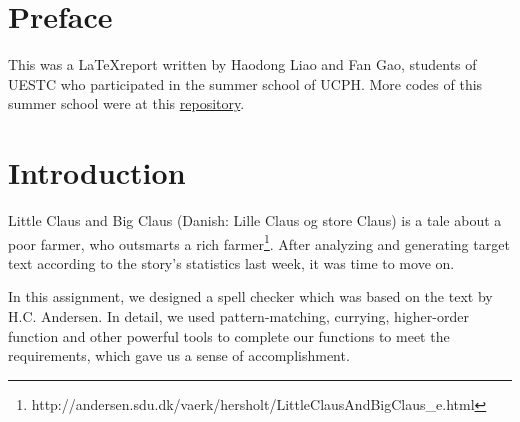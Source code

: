 \documentclass{article}
\begin{document}





\section{Preface}

This was a \LaTeX report written by Haodong Liao and Fan Gao, students of UESTC who participated in the summer school of UCPH. More codes of this summer school were at this \href{https://github.com/Medill-East/ComputerScience/tree/master/Professional%20Core%20Courses/Functional%20Programming/SummerSchool/Advanced%20Functional%20Programming/AdvancedFunctionalProgramming/AdvancedFunctionalProgramming}{repository}.

\section{Introduction}

Little Claus and Big Claus (Danish: Lille Claus og store Claus) is a tale about a poor farmer, who outsmarts a rich farmer\footnote[1]{http://andersen.sdu.dk/vaerk/hersholt/LittleClausAndBigClaus\_e.html}. After analyzing and generating target text according to the story's statistics last week, it was time to move on.

In this assignment, we designed a spell checker which was based on the text by H.C. Andersen. In detail, we used pattern-matching, currying, higher-order function and other powerful tools to complete our functions to meet the requirements, which gave us a sense of accomplishment. 


\end{document}
